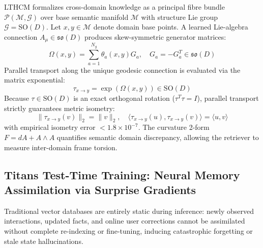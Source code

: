 \documentclass[11pt,a4paper]{article}
\begin{document}
LTHCM formalizes cross-domain knowledge as a principal fibre bundle $\mathcal{P}(\mathcal{M}, \mathcal{G})$ over base semantic manifold $\mathcal{M}$ with structure Lie group $\mathcal{G} = \mathrm{SO}(D)$. Let $x, y \in \mathcal{M}$ denote domain base points. A learned Lie-algebra connection $A_\mu \in \mathfrak{so}(D)$ produces skew-symmetric generator matrices:
\begin{equation}
    \Omega(x, y) = \sum_{a=1}^{N_g} \theta_a(x, y) G_a, \quad G_a = -G_a^T \in \mathfrak{so}(D)
\end{equation}
Parallel transport along the unique geodesic connection is evaluated via the matrix exponential:
\begin{equation}
    \tau_{x \to y} = \exp\left( \Omega(x, y) \right) \in \mathrm{SO}(D)
\end{equation}
Because $\tau \in \mathrm{SO}(D)$ is an exact orthogonal rotation ($\tau^T \tau = I$), parallel transport strictly guarantees metric isometry:
\begin{equation}
    \|\tau_{x \to y}(v)\|_2 = \|v\|_2, \quad \langle \tau_{x \to y}(u), \tau_{x \to y}(v) \rangle = \langle u, v \rangle
\end{equation}
with empirical isometry error $< 1.8 \times 10^{-7}$. The curvature 2-form $F = dA + A \wedge A$ quantifies semantic domain discrepancy, allowing the retriever to measure inter-domain frame torsion.

\subsection{Titans Test-Time Training: Neural Memory Assimilation via Surprise Gradients}

Traditional vector databases are entirely static during inference: newly observed interactions, updated facts, and online user corrections cannot be assimilated without complete re-indexing or fine-tuning, inducing catastrophic forgetting or stale state hallucinations.
\end{document}
